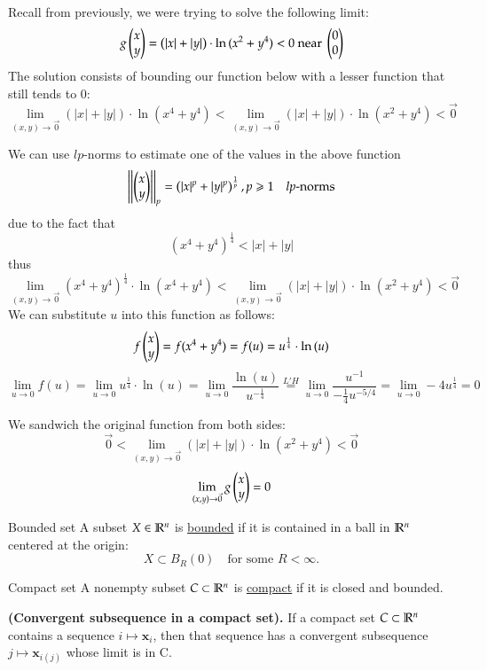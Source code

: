 \\

Recall from previously, we were trying to solve the following limit:
\[g\begin{pmatrix} x \\ y \end{pmatrix}= \left( |x|+|y| \right)\cdot \ln{(x^2+y^4)}<0 \text{ near }\begin{pmatrix} 0 \\ 0 \end{pmatrix}\]
The solution consists of bounding our function below with a lesser function that still tends to 0: 
\[\lim_{(x,y)\to \vec{0}}(|x|+|y|)\cdot \ln{(x^4+y^4)}<\lim_{(x,y)\to \vec{0}}(|x|+|y|)\cdot \ln{(x^2+y^4)}<\vec{0}\]

We can use $lp$-norms to estimate one of the values in the above function
\[\left|\left| \begin{pmatrix} x \\ y \end{pmatrix}\right|\right|_p=\left(|x|^p + |y|^p\right)^{\frac{1}{p}}, p\geqslant 1\quad lp\text{-norms}\]
due to the fact that
\[(x^4+y^4)^{\frac{1}{4}} < |x| + |y|\]
thus
\[\lim_{(x,y)\to \vec{0}}(x^4+y^4)^{\frac{1}{4}}\cdot \ln{(x^4+y^4)}<\lim_{(x,y)\to \vec{0}}(|x|+|y|)\cdot \ln{(x^2+y^4)}<\vec{0}\]
We can substitute $u$ into this function as follows: 
\[f\begin{pmatrix} x \\ y \end{pmatrix}=f(x^4+y^4)=f(u)=u^{\frac{1}{4}}\cdot \ln{(u)}\]
\[\lim_{u\rightarrow 0} f(u)=\lim_{u\rightarrow 0} u^{\frac{1}{4}}\cdot \ln{(u)}=\lim_{u\rightarrow 0} \frac{\ln{(u)}}{u^{-\frac{1}{4}}}\stackrel{L'H}{=}\lim_{u\rightarrow 0} \frac{u^{-1}}{-\frac{1}{4}u^{-5/4}}=\lim_{u\rightarrow 0}-4u^{\frac{1}{4}}=0\]

We sandwich the original function from both sides: 
\[\vec{0}<\lim_{(x,y)\to \vec{0}}(|x|+|y|)\cdot \ln{(x^2+y^4)}<\vec{0}\]
\[\lim_{(x,y)\to \vec{0}} g\begin{pmatrix} x \\ y \end{pmatrix} = 0\]

\newpage

\begin{defn}{Bounded set}
A subset $X\in \mathbb{R}^n$ is \ul{bounded} if it is contained in a ball in $\mathbb{R}^n$ centered at the origin:
  \[X\subset B_R(0)\quad \text{for some }R<\infty.\]
\end{defn}

\begin{defn}{Compact set}
A nonempty subset $C\subset \mathbb{R}^n$ is \ul{compact} if it is closed and bounded.
\end{defn}

\begin{theorem}
  \textbf{(Convergent subsequence in a compact set).} If a compact set $C\subset \mathbb{R}^n$ contains a sequence $i\mapsto \bm{x}_i$, then that sequence has a convergent subsequence $j\mapsto \bm{x}_{i(j)}$ whose limit is in C.
\end{theorem}

